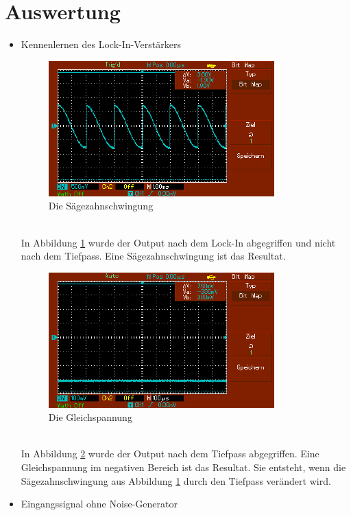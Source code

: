 \documentclass[captions=tableheading]{scrartcl}
\begin{document}
\section{Auswertung}
    \begin{itemize}
        \item{Kennenlernen des Lock-In-Verstärkers \\}
            \begin{figure}
                \centering
                \includegraphics{Lock_In Bilder/Aufgabe 1/MAP001.pdf}
                \caption{Die Sägezahnschwingung}
                \label{fig:sawsig}
            \end{figure}
            \\
            In Abbildung \ref{fig:sawsig} wurde der Output nach dem Lock-In abgegriffen und nicht nach dem Tiefpass.
            Eine Sägezahnschwingung ist das Resultat. 
            \\
            \begin{figure}
                \centering
                \includegraphics{Lock_In Bilder/Aufgabe 1/MAP002.pdf}
                \caption{Die Gleichspannung}
                \label{fig:flatsig}
            \end{figure}
            \\
            In Abbildung \ref{fig:flatsig} wurde der Output nach dem Tiefpass abgegriffen.
            Eine Gleichspannung im negativen Bereich ist das Resultat.
            Sie entsteht, wenn die Sägezahnschwingung aus Abbildung \ref{fig:sawsig} durch den Tiefpass verändert wird.
        \newpage
        \item{Eingangssignal ohne Noise-Generator \\}
            

\end{itemize}
\end{document}
